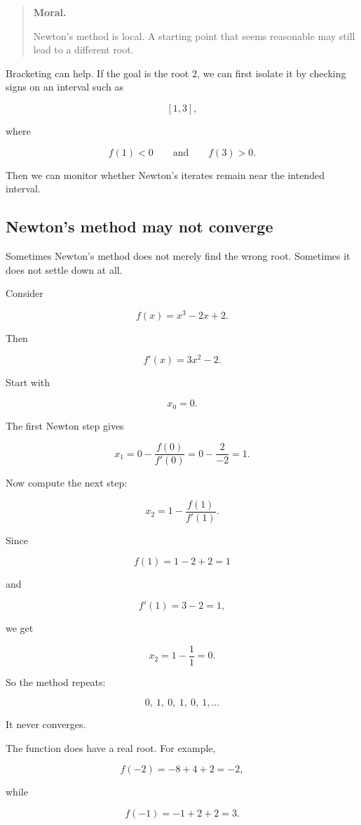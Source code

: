 \begin{quote}
\textbf{Moral.}

Newton's method is local.  A starting point that seems reasonable may still lead to a
different root.
\end{quote}

Bracketing can help.  If the goal is the root \(2\), we can first isolate it by checking
signs on an interval such as

\[
[1,3],
\]

where

\[
f(1)<0
\qquad\text{and}\qquad
f(3)>0.
\]

Then we can monitor whether Newton's iterates remain near the intended interval.

\subsection{Newton's method may not converge}
\label{subsec:newton-no-convergence-warning}

Sometimes Newton's method does not merely find the wrong root.  Sometimes it does
not settle down at all.

Consider

\[
f(x)=x^3-2x+2.
\]

Then

\[
f'(x)=3x^2-2.
\]

Start with

\[
x_0=0.
\]

The first Newton step gives

\[
x_1
=
0-\frac{f(0)}{f'(0)}
=
0-\frac{2}{-2}
=
1.
\]

Now compute the next step:

\[
x_2
=
1-\frac{f(1)}{f'(1)}.
\]

Since

\[
f(1)=1-2+2=1
\]

and

\[
f'(1)=3-2=1,
\]

we get

\[
x_2=1-\frac11=0.
\]

So the method repeats:

\[
0,\ 1,\ 0,\ 1,\ 0,\ 1,\ldots
\]

It never converges.

The function does have a real root.  For example,

\[
f(-2)=-8+4+2=-2,
\]

while

\[
f(-1)=-1+2+2=3.
\]

